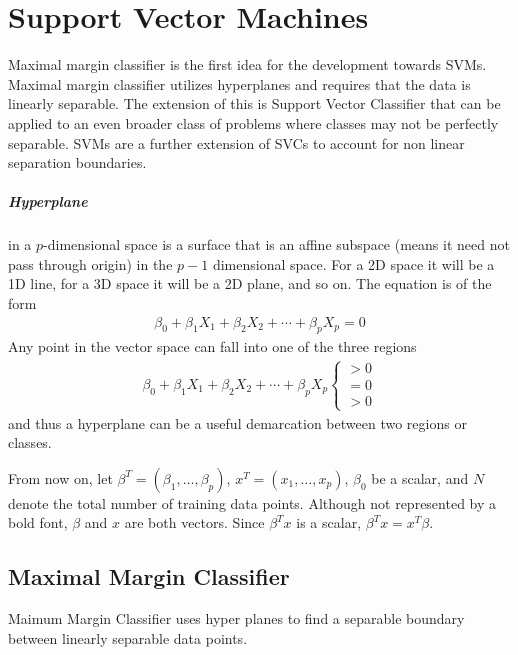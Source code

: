 \documentclass[../statistical_learning_notes.tex]{subfiles}
\begin{document}
    \chapter{Support Vector Machines}
    Maximal margin classifier is the first idea for the development towards SVMs. Maximal margin classifier utilizes hyperplanes and requires that the data is linearly separable. The extension of this is Support Vector Classifier that can be applied to an even broader class of problems where classes may not be perfectly separable. SVMs are a further extension of SVCs to account for non linear separation boundaries.

    \paragraph{Hyperplane} in a $p$-dimensional space is a surface that is an affine subspace (means it need not pass through origin) in the $p-1$ dimensional space. For a 2D space it will be a 1D line, for a 3D space it will be a 2D plane, and so on. The equation is of the form
    \begin{align*}
        \beta_{0} + \beta_{1}X_{1} + \beta_{2}X_{2} + \cdots + \beta_{p}X_{p} = 0
    \end{align*}
    Any point in the vector space can fall into one of the three regions
    \begin{align*}
        \beta_{0} + \beta_{1}X_{1} + \beta_{2}X_{2} + \cdots + \beta_{p}X_{p} \begin{cases}
            > 0\\
            = 0\\
            > 0
        \end{cases}
    \end{align*}
    and thus a hyperplane can be a useful demarcation between two regions or classes.\newline

    From now on, let $\beta^{T} = (\beta_{1}, \ldots, \beta_{p})$, $x^{T} = (x_{1}, \ldots, x_{p})$, $\beta_{0}$ be a scalar, and $N$ denote the total number of training data points. Although not represented by a bold font, $\beta$ and $x$ are both vectors. Since $\beta^{T}x$ is a scalar, $\beta^{T}x = x^{T}\beta$.
    

    \section{Maximal Margin Classifier}
    Maimum Margin Classifier uses hyper planes to find a separable boundary between linearly separable data points.\newline
\end{document}
